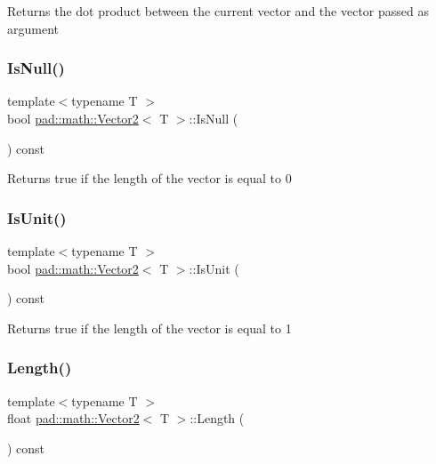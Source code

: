 Returns the dot product between the current vector and the vector passed as argument \mbox{\label{structpad_1_1math_1_1_vector2_a5aeeb38488eb3d220506c64d557e94ae}} 
\subsubsection{\texorpdfstring{Is\+Null()}{IsNull()}}
{\footnotesize\ttfamily template$<$typename T $>$ \\
bool \mbox{\hyperlink{structpad_1_1math_1_1_vector2}{pad\+::math\+::\+Vector2}}$<$ T $>$\+::Is\+Null (\begin{DoxyParamCaption}{ }\end{DoxyParamCaption}) const}

Returns true if the length of the vector is equal to 0 \mbox{\label{structpad_1_1math_1_1_vector2_ac89422aa3df0d31115df268982e9bb0e}} 
\subsubsection{\texorpdfstring{Is\+Unit()}{IsUnit()}}
{\footnotesize\ttfamily template$<$typename T $>$ \\
bool \mbox{\hyperlink{structpad_1_1math_1_1_vector2}{pad\+::math\+::\+Vector2}}$<$ T $>$\+::Is\+Unit (\begin{DoxyParamCaption}{ }\end{DoxyParamCaption}) const}

Returns true if the length of the vector is equal to 1 \mbox{\label{structpad_1_1math_1_1_vector2_a8e02a8ac515710f437624863b1ce1655}} 
\subsubsection{\texorpdfstring{Length()}{Length()}}
{\footnotesize\ttfamily template$<$typename T $>$ \\
float \mbox{\hyperlink{structpad_1_1math_1_1_vector2}{pad\+::math\+::\+Vector2}}$<$ T $>$\+::Length (\begin{DoxyParamCaption}{ }\end{DoxyParamCaption}) const}

